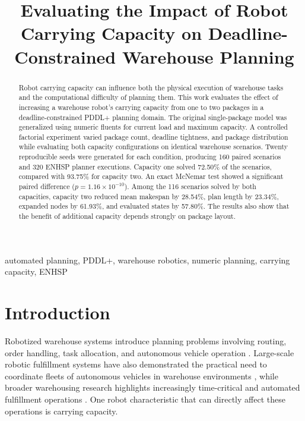 \documentclass[conference]{IEEEtran}
\title{Evaluating the Impact of Robot Carrying Capacity on
Deadline-Constrained Warehouse Planning}
\author{
\IEEEauthorblockN{Paolo Nicolini}
\IEEEauthorblockA{
University of Genoa\\
Research Track II
}
}
\begin{document}
\maketitle

\begin{abstract}
Robot carrying capacity can influence both the physical execution of warehouse
tasks and the computational difficulty of planning them. This work evaluates
the effect of increasing a warehouse robot's carrying capacity from one to two
packages in a deadline-constrained PDDL+ planning domain. The original
single-package model was generalized using numeric fluents for current load
and maximum capacity. A controlled factorial experiment varied package count,
deadline tightness, and package distribution while evaluating both capacity
configurations on identical warehouse scenarios. Twenty reproducible seeds
were generated for each condition, producing 160 paired scenarios and 320
ENHSP planner executions. Capacity one solved 72.50\% of the scenarios,
compared with 93.75\% for capacity two. An exact McNemar test showed a
significant paired difference ($p=1.16\times10^{-10}$). Among the 116
scenarios solved by both capacities, capacity two reduced mean makespan by
28.54\%, plan length by 23.34\%, expanded nodes by 61.93\%, and evaluated
states by 57.80\%. The results also show that the benefit of additional
capacity depends strongly on package layout.
\end{abstract}

\begin{IEEEkeywords}
automated planning, PDDL+, warehouse robotics, numeric planning,
carrying capacity, ENHSP
\end{IEEEkeywords}

\section{Introduction}

Robotized warehouse systems introduce planning problems involving routing,
order handling, task allocation, and autonomous vehicle operation
\cite{azadeh2019,barros2021}. Large-scale robotic fulfillment systems have
also demonstrated the practical need to coordinate fleets of autonomous
vehicles in warehouse environments \cite{wurman2008}, while broader
warehousing research highlights increasingly time-critical and automated
fulfillment operations \cite{boysen2019}. One robot characteristic that can
directly affect these operations is carrying capacity.
\end{document}
